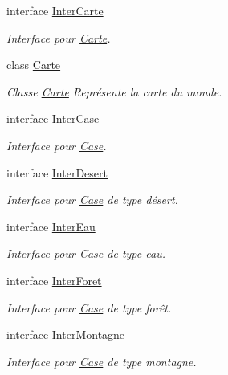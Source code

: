 \begin{DoxyCompactItemize}
\item 
interface \hyperlink{interface_small_world_1_1_inter_carte}{Inter\-Carte}
\begin{DoxyCompactList}\small\item\em Interface pour \hyperlink{class_small_world_1_1_carte}{Carte}. \end{DoxyCompactList}\item 
class \hyperlink{class_small_world_1_1_carte}{Carte}
\begin{DoxyCompactList}\small\item\em Classe \hyperlink{class_small_world_1_1_carte}{Carte} Représente la carte du monde. \end{DoxyCompactList}\item 
interface \hyperlink{interface_small_world_1_1_inter_case}{Inter\-Case}
\begin{DoxyCompactList}\small\item\em Interface pour \hyperlink{class_small_world_1_1_case}{Case}. \end{DoxyCompactList}\item 
interface \hyperlink{interface_small_world_1_1_inter_desert}{Inter\-Desert}
\begin{DoxyCompactList}\small\item\em Interface pour \hyperlink{class_small_world_1_1_case}{Case} de type désert. \end{DoxyCompactList}\item 
interface \hyperlink{interface_small_world_1_1_inter_eau}{Inter\-Eau}
\begin{DoxyCompactList}\small\item\em Interface pour \hyperlink{class_small_world_1_1_case}{Case} de type eau. \end{DoxyCompactList}\item 
interface \hyperlink{interface_small_world_1_1_inter_foret}{Inter\-Foret}
\begin{DoxyCompactList}\small\item\em Interface pour \hyperlink{class_small_world_1_1_case}{Case} de type forêt. \end{DoxyCompactList}\item 
interface \hyperlink{interface_small_world_1_1_inter_montagne}{Inter\-Montagne}
\begin{DoxyCompactList}\small\item\em Interface pour \hyperlink{class_small_world_1_1_case}{Case} de type montagne. \end{DoxyCompactList}\item 

\end{DoxyCompactItemize}
